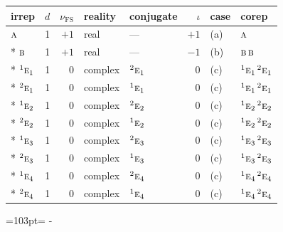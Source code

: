 \documentclass[10pt,a4paper]{article}
\newcommand{\needspace}[1]{\par\penalty-100\begingroup\dimen0=#1\relax\dimen2=\pagegoal
  \advance\dimen2-\pagetotal\ifdim\dimen0>\dimen2\relax\ifdim\dimen2>0pt\vfil\break\fi\fi
  \endgroup}
\numberwithin{equation}{section}
\newcommand{\irr}[1]{\text{\normalfont\scshape #1}}
\newcommand{\conjpair}[1]{{}^{#1}}
\newcommand{\fsind}{\nu_{\mathrm{FS}}}
\begin{document}
{\small\renewcommand{\arraystretch}{1.25}\setlength{\tabcolsep}{4pt}\begin{longtable}{@{}lrrllrll@{}}\toprule
irrep & $d$ & $\fsind$ & reality & conjugate & $\iota$ & case & corep\\\midrule\endhead
\bottomrule\endfoot\endlastfoot
$\irr{a}$ & 1 & $+1$ & real & --- & $+1$ & (a) & $\irr{a}$\\*
$\irr{b}$ & 1 & $+1$ & real & --- & $-1$ & (b) & $\irr{b}\,\irr{b}$\\*
$\conjpair{1}\irr{e}_{1}$ & 1 & $0$ & complex & $\conjpair{2}\irr{e}_{1}$ & $0$ & (c) & $\conjpair{1}\irr{e}_{1}\,\conjpair{2}\irr{e}_{1}$\\*
$\conjpair{2}\irr{e}_{1}$ & 1 & $0$ & complex & $\conjpair{1}\irr{e}_{1}$ & $0$ & (c) & $\conjpair{1}\irr{e}_{1}\,\conjpair{2}\irr{e}_{1}$\\*
$\conjpair{1}\irr{e}_{2}$ & 1 & $0$ & complex & $\conjpair{2}\irr{e}_{2}$ & $0$ & (c) & $\conjpair{1}\irr{e}_{2}\,\conjpair{2}\irr{e}_{2}$\\*
$\conjpair{2}\irr{e}_{2}$ & 1 & $0$ & complex & $\conjpair{1}\irr{e}_{2}$ & $0$ & (c) & $\conjpair{1}\irr{e}_{2}\,\conjpair{2}\irr{e}_{2}$\\*
$\conjpair{1}\irr{e}_{3}$ & 1 & $0$ & complex & $\conjpair{2}\irr{e}_{3}$ & $0$ & (c) & $\conjpair{1}\irr{e}_{3}\,\conjpair{2}\irr{e}_{3}$\\*
$\conjpair{2}\irr{e}_{3}$ & 1 & $0$ & complex & $\conjpair{1}\irr{e}_{3}$ & $0$ & (c) & $\conjpair{1}\irr{e}_{3}\,\conjpair{2}\irr{e}_{3}$\\*
$\conjpair{1}\irr{e}_{4}$ & 1 & $0$ & complex & $\conjpair{2}\irr{e}_{4}$ & $0$ & (c) & $\conjpair{1}\irr{e}_{4}\,\conjpair{2}\irr{e}_{4}$\\*
$\conjpair{2}\irr{e}_{4}$ & 1 & $0$ & complex & $\conjpair{1}\irr{e}_{4}$ & $0$ & (c) & $\conjpair{1}\irr{e}_{4}\,\conjpair{2}\irr{e}_{4}$\\
\bottomrule\end{longtable}}
\needspace{103pt}
\end{document}
